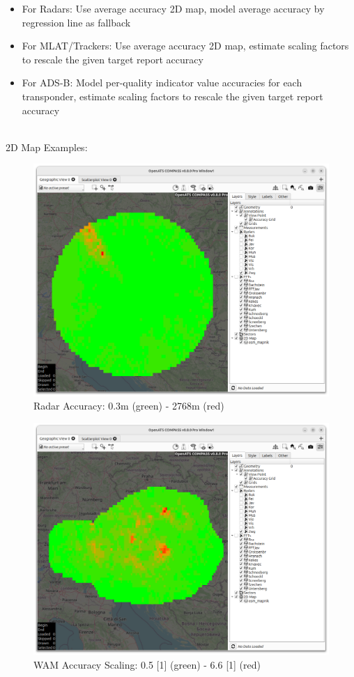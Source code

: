 \begin{itemize}
\begin{itemize}
\item For Radars: Use average accuracy 2D map, model average accuracy by regression line as fallback
\item For MLAT/Trackers: Use average accuracy 2D map, estimate scaling factors to rescale the given target report accuracy
\item For ADS-B: Model per-quality indicator value accuracies for each transponder, estimate scaling factors to rescale the given target report accuracy
\end{itemize}
\ \\

2D Map Examples:
\begin{figure}[H]
    \hspace*{-2.5cm}
    \includegraphics[width=19cm]{figures/radar_acc.png}
  \caption{Radar Accuracy: 0.3m (green) - 2768m (red)}
\end{figure} 

\begin{figure}[H]
    \hspace*{-2.5cm}
    \includegraphics[width=19cm]{figures/wam_scaling.png}
  \caption{WAM Accuracy Scaling: 0.5 [1] (green) - 6.6 [1] (red)}
\end{figure} 


\end{itemize}
